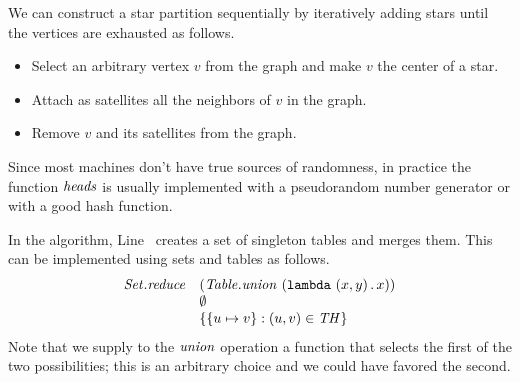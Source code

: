 
\begin{gram}
\label{graphcon::star::partition::seq}

We can construct a star partition sequentially by iteratively adding
stars until the vertices are exhausted as follows.

\begin{itemize}

\item Select an arbitrary vertex $v$ from the graph and make $v$ the
  center of a star.

\item Attach as satellites all the neighbors of $v$ in the graph.

\item Remove $v$ and its satellites from the graph.

\end{itemize}
%
\end{gram}


\begin{note}
\label{graphcon::star::partition::implementing-heads}

Since most machines don't have true sources of randomness, in practice
the function $\mathit{heads}$ is usually implemented with a
pseudorandom number generator or with a good hash function.

In the algorithm, Line~\linegcstarmerge{} creates a set of
singleton tables and merges them.
%
This can be implemented using sets and tables as follows.
%
\[
\begin{array}{ll}
  \mathit{Set.reduce}
  & (\mathit{Table.union}~(\texttt{lambda}~{(x,y)}\,.\,x))
\\
& \emptyset
\\
& \left\{ \left\{ u \mapsto v \right\} : (u,v) \in \mathit{TH} \right\}
\end{array}
\]
Note that we supply to the $\mathit{union}$ operation a function that selects the first of the two possibilities; this is an arbitrary choice and we could have favored the second.

\end{note}

